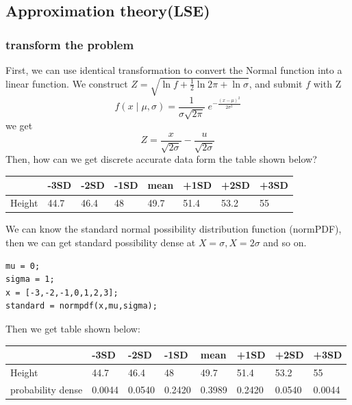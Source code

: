 \documentclass[
10pt, %
a4paper, %
oneside, %
headinclude,footinclude, %
BCOR5mm, %
]{scrartcl}
\begin{document}
\subsection{Approximation theory(LSE)}
\subsubsection{transform the problem}
First, we can use identical transformation to convert the Normal function into a linear function. We construct $Z = \sqrt {\ln f + \frac{1}{2}\ln 2\pi  + \ln \sigma } $, and submit $f$ with Z
\begin{equation}\label{eq:normpdf}
f(x \; | \; \mu, \sigma) = \frac{1}{\sigma\sqrt{2\pi} } \; e^{ -\frac{(x-\mu)^2}{2\sigma^2} }
\end{equation}
we get
\begin{equation}\label{eq:normlinear}
Z = \frac{x}{{\sqrt {2\sigma } }} - \frac{u}{{\sqrt {2\sigma } }}
\end{equation}
Then, how can we get discrete accurate data form the table shown below?\\


\begin{table}[h]\centering\begin{tabular}{llllllll}
\hline
&-3SD&-2SD&-1SD&mean&+1SD&+2SD&+3SD\\
\hline
{Height}&{\small 44.7}&{\small 46.4}&{\small 48}&{\small 49.7}&{\small 51.4}&{\small 53.2}&{\small 55}\\
\hline
\end{tabular}
\end{table}
We can know the standard normal possibility distribution function (normPDF), then we can get standard possibility dense at $X=\sigma, X=2\sigma $ and so on.
\begin{lstlisting}
mu = 0;
sigma = 1;
x = [-3,-2,-1,0,1,2,3];
standard = normpdf(x,mu,sigma);
\end{lstlisting}
Then we get table shown below:
\begin{table}[h]\centering \begin{tabular}{llllllll}
\hline
&-3SD&-2SD&-1SD&mean&+1SD&+2SD&+3SD\\
\hline
{\small Height}&{\small 44.7}&{\small 46.4}&{\small 48}&{\small 49.7}&{\small 51.4}&{\small 53.2}&{\small 55}\\
\hline
probability dense& 0.0044&0.0540&0.2420&0.3989&0.2420&0.0540&0.0044\\
\hline
\end{tabular}
\end{table}
\end{document}
